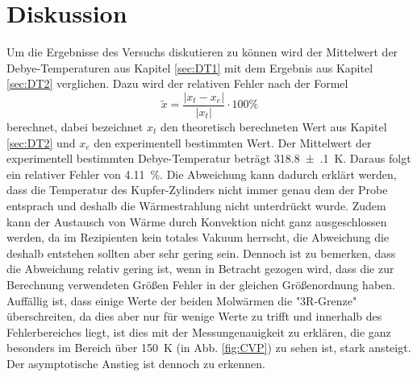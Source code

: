 \section{Diskussion}
\label{sec:Diskussion}
Um die Ergebnisse des Versuchs diskutieren zu können wird der Mittelwert der Debye-Temperaturen 
aus Kapitel \ref{sec:DT1} mit dem Ergebnis aus Kapitel \ref{sec:DT2} verglichen. 
Dazu wird der relativen Fehler nach der Formel
\begin{equation*}
  \tilde{x} = \frac{ \lvert x_{t} - x_{e} \rvert}{\lvert x_{t} \rvert}
  \cdot 100 \%
\label{eq:relf}
\end{equation*}
berechnet, dabei bezeichnet $x_{t}$ den theoretisch berechneten Wert aus Kapitel \ref{sec:DT2} und 
$x_{e}$ den experimentell bestimmten Wert. Der Mittelwert der experimentell bestimmten 
Debye-Temperatur beträgt \SI{318.8(1)}{\kelvin}.
Daraus folgt ein relativer Fehler von \SI{4.11}{\percent}. 
Die Abweichung kann dadurch erklärt 
werden, dass die Temperatur des Kupfer-Zylinders nicht immer genau dem der Probe entsprach und 
deshalb die Wärmestrahlung nicht unterdrückt wurde. Zudem kann der Austausch von Wärme durch 
Konvektion nicht ganz ausgeschlossen werden, da im Rezipienten kein totales Vakuum herrscht, 
die Abweichung die deshalb entstehen sollten aber sehr gering sein. 
Dennoch ist zu bemerken, dass die Abweichung 
relativ gering ist, wenn in Betracht gezogen wird, dass die zur Berechnung verwendeten Größen 
Fehler in der gleichen Größenordnung haben. Auffällig ist, dass einige Werte der beiden Molwärmen 
die "3R-Grenze" überschreiten, da dies aber nur für wenige Werte zu trifft und innerhalb des 
Fehlerbereiches liegt, ist dies mit der Messungenauigkeit zu erklären, die ganz besonders im 
Bereich über \SI{150}{\kelvin} (in Abb. \ref{fig:CVP}) zu sehen ist, stark ansteigt. Der 
asymptotische Anstieg ist dennoch zu erkennen. 


